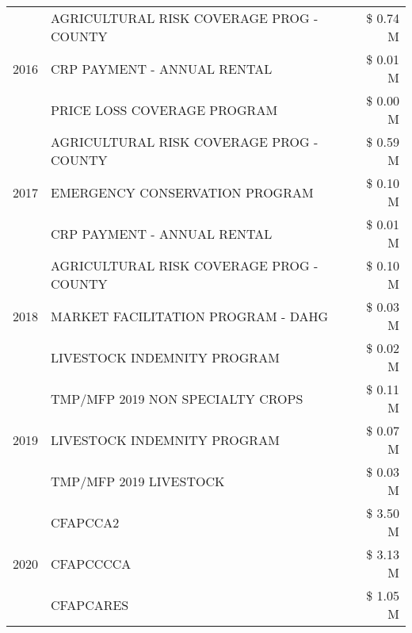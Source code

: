 \begin{tabular}{llr}
\cline{1-3}
\multirow[t]{3}{*}{2016} & AGRICULTURAL RISK COVERAGE PROG - COUNTY & \$ 0.74 M \\
 & CRP PAYMENT - ANNUAL RENTAL & \$ 0.01 M \\
 & PRICE LOSS COVERAGE PROGRAM & \$ 0.00 M \\
\cline{1-3}
\multirow[t]{3}{*}{2017} & AGRICULTURAL RISK COVERAGE PROG - COUNTY & \$ 0.59 M \\
 & EMERGENCY CONSERVATION PROGRAM & \$ 0.10 M \\
 & CRP PAYMENT - ANNUAL RENTAL & \$ 0.01 M \\
\cline{1-3}
\multirow[t]{3}{*}{2018} & AGRICULTURAL RISK COVERAGE PROG - COUNTY & \$ 0.10 M \\
 & MARKET FACILITATION PROGRAM - DAHG & \$ 0.03 M \\
 & LIVESTOCK INDEMNITY PROGRAM & \$ 0.02 M \\
\cline{1-3}
\multirow[t]{3}{*}{2019} & TMP/MFP 2019 NON SPECIALTY CROPS & \$ 0.11 M \\
 & LIVESTOCK INDEMNITY PROGRAM & \$ 0.07 M \\
 & TMP/MFP 2019 LIVESTOCK & \$ 0.03 M \\
\cline{1-3}
\multirow[t]{3}{*}{2020} & CFAPCCA2 & \$ 3.50 M \\
 & CFAPCCCCA & \$ 3.13 M \\
 & CFAPCARES & \$ 1.05 M \\
\cline{1-3}
\bottomrule
\end{tabular}
